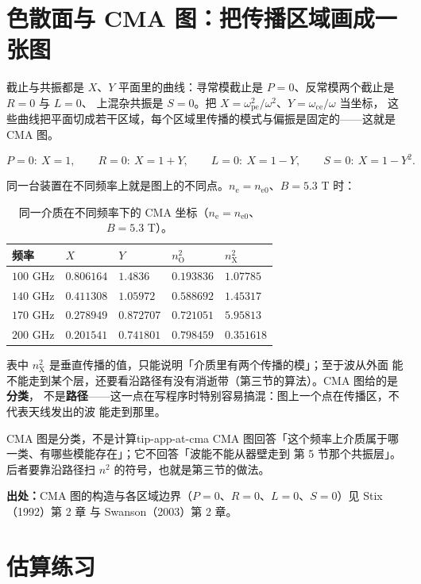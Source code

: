 \section{色散面与 CMA 图：把传播区域画成一张图}
\label{sec:app-at-cma}

截止与共振都是 $X$、$Y$ 平面里的曲线：寻常模截止是 $P=0$、反常模两个截止是 $R=0$ 与 $L=0$、
上混杂共振是 $S=0$。把 $X=\omega_\mathrm{pe}^2/\omega^2$、$Y=\omega_\mathrm{ce}/\omega$ 当坐标，
这些曲线把平面切成若干区域，每个区域里传播的模式与偏振是固定的——这就是 CMA 图。

\begin{equation}
P=0:\ X=1,\qquad
R=0:\ X=1+Y,\qquad
L=0:\ X=1-Y,\qquad
S=0:\ X=1-Y^2 .
\label{eq:app-at-cma}
\end{equation}

同一台装置在不同频率上就是图上的不同点。$n_\mathrm{e}=n_\mathrm{e0}$、$B=5.3$ T 时：

\begin{table}[htbp]
\centering
\small
\caption{同一介质在不同频率下的 CMA 坐标（$n_\mathrm{e}=n_\mathrm{e0}$、$B=5.3$ T）。}
\label{tab:app-at-cma}
\begin{tabular}{p{2.6cm}p{3.0cm}p{3.0cm}p{3.2cm}p{3.2cm}}
\hline
频率 & $X$ & $Y$ & $n_\mathrm{O}^2$ & $n_\mathrm{X}^2$ \\
\hline
$100$ GHz & $0.806164$ & $1.4836$ & $0.193836$ & $1.07785$ \\
$140$ GHz & $0.411308$ & $1.05972$ & $0.588692$ & $1.45317$ \\
$170$ GHz & $0.278949$ & $0.872707$ & $0.721051$ & $5.95813$ \\
$200$ GHz & $0.201541$ & $0.741801$ & $0.798459$ & $0.351618$ \\
\hline
\end{tabular}
\end{table}

表中 $n_\mathrm{X}^2$ 是垂直传播的值，只能说明「介质里有两个传播的模」；至于波从外面
能不能走到某个层，还要看沿路径有没有消逝带（第三节的算法）。CMA 图给的是\textbf{分类}，
不是\textbf{路径}——这一点在写程序时特别容易搞混：图上一个点在传播区，不代表天线发出的波
能走到那里。

\begin{tip}{CMA 图是分类，不是计算}{tip-app-at-cma}
CMA 图回答「这个频率上介质属于哪一类、有哪些模能存在」；它不回答「波能不能从器壁走到
第 5 节那个共振层」。后者要靠沿路径扫 $n^2$ 的符号，也就是第三节的做法。
\end{tip}

{\footnotesize
\textbf{出处：}CMA 图的构造与各区域边界（$P=0$、$R=0$、$L=0$、$S=0$）见 Stix（1992）第 2 章
与 Swanson（2003）第 2 章。
\section{估算练习}
\label{sec:app-at-problems}
}

